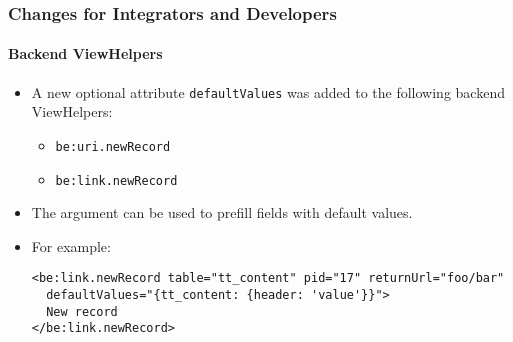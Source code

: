 %

\begin{frame}[fragile]
	\frametitle{Changes for Integrators and Developers}
	\framesubtitle{Backend ViewHelpers}

	\lstset{basicstyle=\tiny\ttfamily}

	\begin{itemize}
		\item A new optional attribute \texttt{defaultValues} was added to the following
			backend ViewHelpers:

			\begin{itemize}\smaller
				\item \texttt{be:uri.newRecord}
				\item \texttt{be:link.newRecord}
			\end{itemize}\normalsize

		\item The argument can be used to prefill fields with default values.
		\item For example:
\begin{lstlisting}
<be:link.newRecord table="tt_content" pid="17" returnUrl="foo/bar"
  defaultValues="{tt_content: {header: 'value'}}">
  New record
</be:link.newRecord>
\end{lstlisting}
	\end{itemize}

\end{frame}

